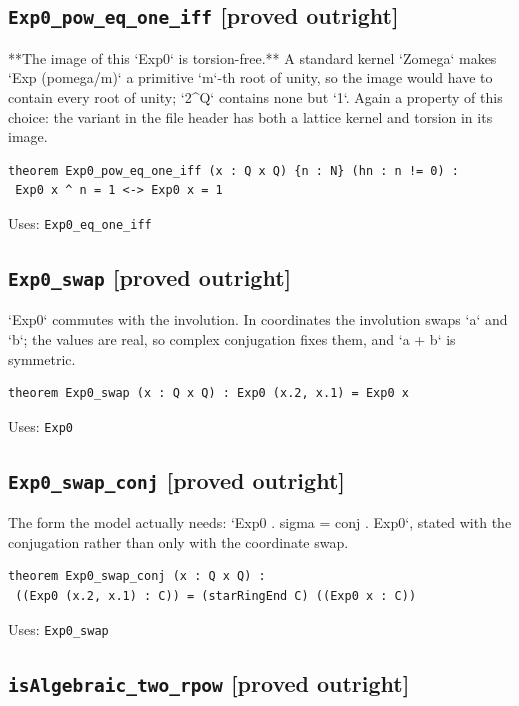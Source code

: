 \documentclass[11pt,a4paper]{article}
\newcommand{\tagpr}{\textcolor{provedc}{\textbf{[proved outright]}}}
\begin{document}
\subsection*{\texttt{Exp0\_pow\_eq\_one\_iff} \hfill \tagpr}

**The image of this `Exp0` is torsion-free.** A standard kernel `Zomega` makes `Exp (pomega/m)` a primitive `m`-th root of unity, so the image would have to contain every root of unity; `2\^{}Q` contains none but `1`. Again a property of this choice: the variant in the file header has both a lattice kernel and torsion in its image.

\begin{lstlisting}
theorem Exp0_pow_eq_one_iff (x : Q x Q) {n : N} (hn : n != 0) :
 Exp0 x ^ n = 1 <-> Exp0 x = 1
\end{lstlisting}
\noindent\footnotesize Uses: \texttt{Exp0\_eq\_one\_iff}\normalsize


\subsection*{\texttt{Exp0\_swap} \hfill \tagpr}

`Exp0` commutes with the involution. In coordinates the involution swaps `a` and `b`; the values are real, so complex conjugation fixes them, and `a + b` is symmetric.

\begin{lstlisting}
theorem Exp0_swap (x : Q x Q) : Exp0 (x.2, x.1) = Exp0 x
\end{lstlisting}
\noindent\footnotesize Uses: \texttt{Exp0}\normalsize


\subsection*{\texttt{Exp0\_swap\_conj} \hfill \tagpr}

The form the model actually needs: `Exp0 . sigma = conj . Exp0`, stated with the conjugation rather than only with the coordinate swap.

\begin{lstlisting}
theorem Exp0_swap_conj (x : Q x Q) :
 ((Exp0 (x.2, x.1) : C)) = (starRingEnd C) ((Exp0 x : C))
\end{lstlisting}
\noindent\footnotesize Uses: \texttt{Exp0\_swap}\normalsize


\subsection*{\texttt{isAlgebraic\_two\_rpow} \hfill \tagpr}
\end{document}
